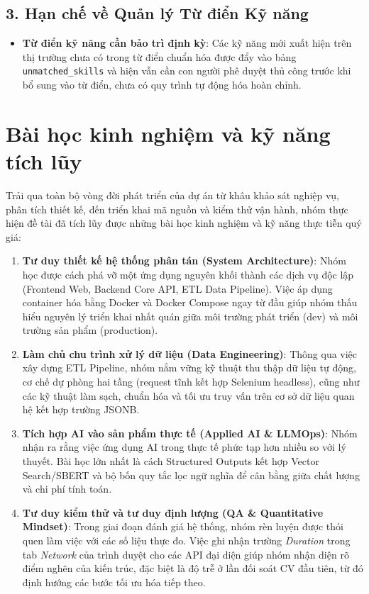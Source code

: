 \subsection*{3. Hạn chế về Quản lý Từ điển Kỹ năng}
\begin{itemize}
    \item \textbf{Từ điển kỹ năng cần bảo trì định kỳ}: Các kỹ năng mới xuất hiện trên thị trường chưa có trong từ điển chuẩn hóa được đẩy vào bảng \texttt{unmatched\_skills} và hiện vẫn cần con người phê duyệt thủ công trước khi bổ sung vào từ điển, chưa có quy trình tự động hóa hoàn chỉnh.
\end{itemize}


\section*{Bài học kinh nghiệm và kỹ năng tích lũy}

Trải qua toàn bộ vòng đời phát triển của dự án từ khâu khảo sát nghiệp vụ, phân tích thiết kế, đến triển khai mã nguồn và kiểm thử vận hành, nhóm thực hiện đề tài đã tích lũy được những bài học kinh nghiệm và kỹ năng thực tiễn quý giá:

\begin{enumerate}
    \item \textbf{Tư duy thiết kế hệ thống phân tán (System Architecture)}: Nhóm học được cách phá vỡ một ứng dụng nguyên khối thành các dịch vụ độc lập (Frontend Web, Backend Core API, ETL Data Pipeline). Việc áp dụng container hóa bằng Docker và Docker Compose ngay từ đầu giúp nhóm thấu hiểu nguyên lý triển khai nhất quán giữa môi trường phát triển (dev) và môi trường sản phẩm (production).

    \item \textbf{Làm chủ chu trình xử lý dữ liệu (Data Engineering)}: Thông qua việc xây dựng ETL Pipeline, nhóm nắm vững kỹ thuật thu thập dữ liệu tự động, cơ chế dự phòng hai tầng (request tĩnh kết hợp Selenium headless), cũng như các kỹ thuật làm sạch, chuẩn hóa và tối ưu truy vấn trên cơ sở dữ liệu quan hệ kết hợp trường JSONB.

    \item \textbf{Tích hợp AI vào sản phẩm thực tế (Applied AI \& LLMOps)}: Nhóm nhận ra rằng việc ứng dụng AI trong thực tế phức tạp hơn nhiều so với lý thuyết. Bài học lớn nhất là cách Structured Outputs kết hợp Vector Search/SBERT và bộ bốn quy tắc lọc ngữ nghĩa để cân bằng giữa chất lượng và chi phí tính toán.

    \item \textbf{Tư duy kiểm thử và tư duy định lượng (QA \& Quantitative Mindset)}: Trong giai đoạn đánh giá hệ thống, nhóm rèn luyện được thói quen làm việc với các số liệu thực đo. Việc ghi nhận trường \textit{Duration} trong tab \textit{Network} của trình duyệt cho các API đại diện giúp nhóm nhận diện rõ điểm nghẽn của kiến trúc, đặc biệt là độ trễ ở lần đối soát CV đầu tiên, từ đó định hướng các bước tối ưu hóa tiếp theo.
\end{enumerate}

